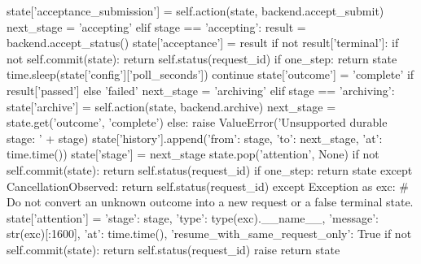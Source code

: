                             state['acceptance_submission'] = self.action(state, backend.accept_submit)
                            next_stage = 'accepting'
                    elif stage == 'accepting':
                        result = backend.accept_status()
                        state['acceptance'] = result
                        if not result['terminal']:
                            if not self.commit(state):
                                return self.status(request_id)
                            if one_step:
                                return state
                            time.sleep(state['config']['poll_seconds'])
                            continue
                        state['outcome'] = 'complete' if result['passed'] else 'failed'
                        next_stage = 'archiving'
                    elif stage == 'archiving':
                        state['archive'] = self.action(state, backend.archive)
                        next_stage = state.get('outcome', 'complete')
                    else:
                        raise ValueError('Unsupported durable stage: ' + stage)
                    state['history'].append({'from': stage, 'to': next_stage, 'at': time.time()})
                    state['stage'] = next_stage
                    state.pop('attention', None)
                    if not self.commit(state):
                        return self.status(request_id)
                    if one_step:
                        return state
                except CancellationObserved:
                    return self.status(request_id)
                except Exception as exc:
                    # Do not convert an unknown outcome into a new request or a false terminal state.
                    state['attention'] = {'stage': stage, 'type': type(exc).__name__,
                                          'message': str(exc)[:1600], 'at': time.time(),
                                          'resume_with_same_request_only': True}
                    if not self.commit(state):
                        return self.status(request_id)
                    raise
            return state

